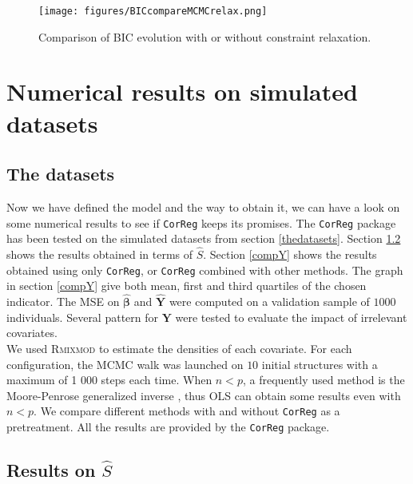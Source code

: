 \documentclass[12pt,a4paper]{report}
\begin{document}
\begin{center}
	\begin{figure}[h!]
	\centering
\texttt{[image: figures/BICcompareMCMCrelax.png]} 		
\caption{Comparison of BIC evolution with or without constraint relaxation.}\label{compareBICrelax}
	\end{figure}
	\end{center}
			
		
	\chapter{Numerical results on simulated datasets} \label{sectionsimul}


	\section{The datasets}	
	Now we have defined the model and the way to obtain it, we can have a look on some numerical results to see if {\tt CorReg} 	keeps its promises.
	The {\tt CorReg} package has been tested on the simulated datasets from section \ref{thedatasets}.
Section \ref{compZ} shows the results obtained in terms of $\hat{S}$. Section \ref{compY} shows the results obtained using only {\tt CorReg}, or {\tt CorReg} combined with other methods. The graph in section \ref{compY} give both mean, first and third quartiles of the chosen indicator. The MSE on $\hat{\boldsymbol{\beta}}$ and $\hat{\boldsymbol{Y}}$ were computed on a validation sample of $1 000$ individuals. Several pattern for $\boldsymbol{Y}$ were tested to evaluate the impact of irrelevant covariates.\\

	We used \textsc{Rmixmod} to estimate the densities of each covariate. For each configuration, the MCMC walk was launched on $10$ initial structures with a maximum of 1 000 steps each time.
	When $n<p$, a frequently used method is the Moore-Penrose generalized inverse \cite{katsikis2008fast}, thus OLS can obtain some results even with $n<p$. %
	We compare different methods with and without {\tt CorReg} as a pretreatment. All the results are provided by the {\tt CorReg} package.
	
		\section{Results on $\hat S$}	\label{compZ}
\end{document}
